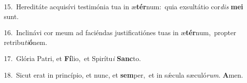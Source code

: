 {\numbfont\textcolor{\numbcolor}{15.}}~Hereditáte acquisívi testimónia tua in æ\-\textbf{tér}\-num:~\star quia exsultátio cor\textit{dis} \textbf{me}\-\textbf{i} sunt.\par
{\numbfont\textcolor{\numbcolor}{16.}}~Inclinávi cor meum ad faciéndas justificatiónes tuas in æ\-\textbf{tér}\-num,~\star propter retribu\-\textit{ti}\-\textbf{ó}nem.\par
{\numbfont\textcolor{\numbcolor}{17.}}~Glória Patri, et \textbf{Fí}\-lio,~\star et Spirítu\textit{i} \textbf{Sanc}\-to.\par
{\numbfont\textcolor{\numbcolor}{18.}}~Sicut erat in princípio, et nunc, et \textbf{sem}\-per,~\star et in sǽcula sæculó\-\textit{rum}\-. \textbf{A}\-men.\par
